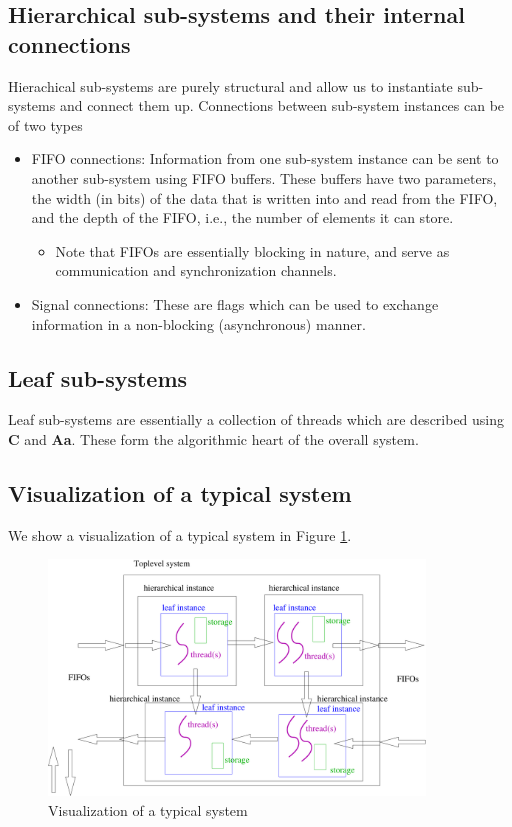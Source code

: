\documentclass{article}
\begin{document}
\subsection{Hierarchical sub-systems and their internal connections}

Hierachical sub-systems are purely structural and allow us to instantiate sub-systems
and connect them up.   Connections between sub-system instances can be of
two types
\begin{itemize}
\item FIFO connections:  Information from one sub-system instance can be sent to
another sub-system using FIFO buffers.  These buffers have two parameters, the
width (in bits) of the data that is written into and read from the FIFO, and the
depth of the FIFO, i.e., the number of elements it can store.
\begin{itemize}
\item Note that FIFOs are essentially blocking in nature, and serve as communication
and synchronization channels.
\end{itemize}
\item Signal connections: These are flags which can be used to exchange information
in a non-blocking (asynchronous) manner.
\end{itemize}

\subsection{Leaf sub-systems}

Leaf sub-systems are essentially a collection of threads which are described using
{\bf C} and {\bf Aa}.   These form the algorithmic heart of the overall system.


\subsection{Visualization of a typical system}

We show a visualization of a typical system in Figure \ref{fig:visualization}.
\begin{figure}
\centering
\includegraphics[width=10cm]{figs/visualization.pdf}
\caption{Visualization of a typical system}
\label{fig:visualization}
\end{figure}
\end{document}
